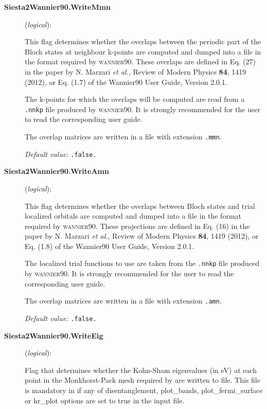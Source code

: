 \begin{description}
\item[\textbf{Siesta2Wannier90.WriteMmn}] (\textit{logical}):

This flag determines whether the overlaps between the periodic part
of the Bloch states at neighbour k-points are computed and dumped into a file
in the format required by \textsc{wannier90}.
These overlaps are defined in Eq. (27) in the paper by
N. Marzari \textit{et al.}, Review of Modern Physics \textbf{84}, 1419 (2012),
or Eq. (1.7) of the Wannier90 User Guide, Version 2.0.1.

The k-points for which the overlaps will be computed are read from a
\texttt{.nnkp} file produced by \textsc{wannier90}. It is strongly
recommended for the user to read the corresponding user guide.

The overlap matrices are written in a file with extension \texttt{.mmn}.

\textit{Default value:} \texttt{.false.}

\item[\textbf{Siesta2Wannier90.WriteAmn}] (\textit{logical}):

This flag determines whether the overlaps between Bloch states
and trial localized orbitals are computed and dumped into a file in the
format required by \textsc{wannier90}.
These projections are defined in Eq. (16) in the paper by
N. Marzari \textit{et al.}, Review of Modern Physics \textbf{84}, 1419 (2012),
or Eq. (1.8) of the Wannier90 User Guide, Version 2.0.1.

The localized trial functions to use are taken from the \texttt{.nnkp}
file produced by \textsc{wannier90}. It is strongly recommended for the
user to read the corresponding user guide.

The overlap matrices are written in a file with extension \texttt{.amn}.

\textit{Default value:} \texttt{.false.}

\item[\textbf{Siesta2Wannier90.WriteEig}] (\textit{logical}):

Flag that determines whether the Kohn-Sham eigenvalues 
(in eV) at each point in the Monkhorst-Pack mesh required by
 are written to file. 
This file is mandatory in  if any of disentanglement, 
plot\_bands, plot\_fermi\_surface or hr\_plot options are set to true in 
the  input file.


\end{description}

